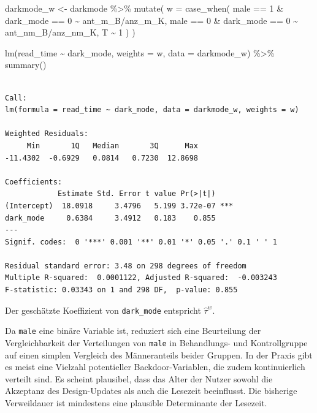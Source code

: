 \documentclass[
  a4paper,
  DIV=11,
  oneside]{scrreprt}
\newenvironment{Shaded}{\begin{snugshade}}{\end{snugshade}}
\newcommand{\AttributeTok}[1]{\textcolor[rgb]{0.40,0.45,0.13}{#1}}
\newcommand{\DecValTok}[1]{\textcolor[rgb]{0.68,0.00,0.00}{#1}}
\newcommand{\FunctionTok}[1]{\textcolor[rgb]{0.28,0.35,0.67}{#1}}
\newcommand{\NormalTok}[1]{\textcolor[rgb]{0.00,0.23,0.31}{#1}}
\newcommand{\OtherTok}[1]{\textcolor[rgb]{0.00,0.23,0.31}{#1}}
\newcommand{\SpecialCharTok}[1]{\textcolor[rgb]{0.37,0.37,0.37}{#1}}
\begin{document}
\begin{Shaded}
\begin{Highlighting}[]
\NormalTok{darkmode\_w }\OtherTok{\textless{}{-}}\NormalTok{ darkmode }\SpecialCharTok{\%\textgreater{}\%} 
  \FunctionTok{mutate}\NormalTok{(}
    \AttributeTok{w =} \FunctionTok{case\_when}\NormalTok{(}
\NormalTok{      male }\SpecialCharTok{==} \DecValTok{1} \SpecialCharTok{\&}\NormalTok{ dark\_mode }\SpecialCharTok{==} \DecValTok{0} \SpecialCharTok{\textasciitilde{}}\NormalTok{ ant\_m\_B}\SpecialCharTok{/}\NormalTok{anz\_m\_K,}
\NormalTok{      male }\SpecialCharTok{==} \DecValTok{0} \SpecialCharTok{\&}\NormalTok{ dark\_mode }\SpecialCharTok{==} \DecValTok{0} \SpecialCharTok{\textasciitilde{}}\NormalTok{ ant\_nm\_B}\SpecialCharTok{/}\NormalTok{anz\_nm\_K,}
\NormalTok{      T }\SpecialCharTok{\textasciitilde{}} \DecValTok{1}
\NormalTok{    )}
\NormalTok{  ) }

\FunctionTok{lm}\NormalTok{(read\_time }\SpecialCharTok{\textasciitilde{}}\NormalTok{ dark\_mode, }\AttributeTok{weights =}\NormalTok{ w, }\AttributeTok{data =}\NormalTok{ darkmode\_w) }\SpecialCharTok{\%\textgreater{}\%}
  \FunctionTok{summary}\NormalTok{()}
\end{Highlighting}
\end{Shaded}

\begin{verbatim}

Call:
lm(formula = read_time ~ dark_mode, data = darkmode_w, weights = w)

Weighted Residuals:
     Min       1Q   Median       3Q      Max 
-11.4302  -0.6929   0.0814   0.7230  12.8698 

Coefficients:
            Estimate Std. Error t value Pr(>|t|)    
(Intercept)  18.0918     3.4796   5.199 3.72e-07 ***
dark_mode     0.6384     3.4912   0.183    0.855    
---
Signif. codes:  0 '***' 0.001 '**' 0.01 '*' 0.05 '.' 0.1 ' ' 1

Residual standard error: 3.48 on 298 degrees of freedom
Multiple R-squared:  0.0001122, Adjusted R-squared:  -0.003243 
F-statistic: 0.03343 on 1 and 298 DF,  p-value: 0.855
\end{verbatim}

Der geschätzte Koeffizient von \texttt{dark\_mode} entspricht
\(\widehat{\tau}^w\).

Da \texttt{male} eine binäre Variable ist, reduziert sich eine
Beurteilung der Vergleichbarkeit der Verteilungen von \texttt{male} in
Behandlungs- und Kontrollgruppe auf einen simplen Vergleich des
Männeranteils beider Gruppen. In der Praxis gibt es meist eine Vielzahl
potentieller Backdoor-Variablen, die zudem kontinuierlich verteilt sind.
Es scheint plausibel, dass das Alter der Nutzer sowohl die Akzeptanz des
Design-Updates als auch die Lesezeit beeinflusst. Die bisherige
Verweildauer ist mindestens eine plausible Determinante der Lesezeit.
\end{document}
